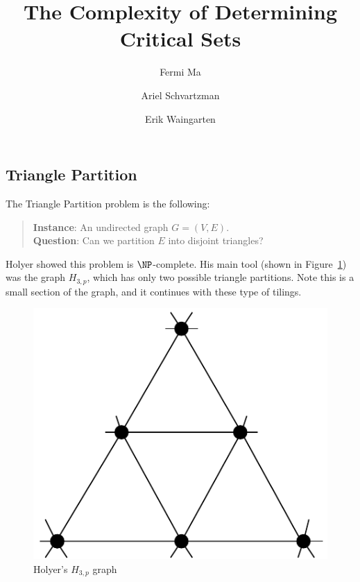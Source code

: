 \documentclass[runningheads,a4paper]{llncs}
\begin{document}
\mainmatter  %

\title{The Complexity of Determining Critical Sets}


%
%
\author{Fermi Ma \and Ariel Schvartzman \and Erik Waingarten}
%


%
%

\maketitle

\subsection{Triangle Partition}\label{S:TP}

The Triangle Partition problem is the following:
\begin{quote}
\textbf{Instance}: An undirected graph $G = (V, E)$.\\
\textbf{Question}: Can we partition $E$ into disjoint triangles?
\end{quote}

Holyer \cite{holyer1981np} showed this problem is $\NP$-complete. His main tool (shown in Figure~\ref{fig:holyergraph}) was the graph $H_{3, p}$, which has only two possible triangle partitions. Note this is a small section of the graph, and it continues with these type of tilings.
\begin{figure}
\label{fig:holyergraph}
\centering
\includegraphics[width=0.4\linewidth]{Holyergraph.pdf}
\caption{Holyer's $H_{3,p}$ graph}
\end{figure}
\end{document}
